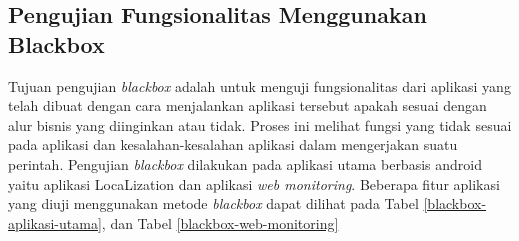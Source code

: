 \subsection{Pengujian Fungsionalitas Menggunakan Blackbox}
\par Tujuan pengujian \textit{blackbox} adalah untuk menguji fungsionalitas dari aplikasi yang telah dibuat dengan cara menjalankan aplikasi tersebut apakah sesuai dengan alur bisnis yang diinginkan atau tidak. Proses ini melihat fungsi yang tidak sesuai pada aplikasi dan kesalahan-kesalahan aplikasi dalam mengerjakan suatu perintah. Pengujian \textit{blackbox} dilakukan pada aplikasi utama berbasis android yaitu aplikasi LocaLization dan aplikasi \textit{web monitoring}. Beberapa fitur aplikasi yang diuji menggunakan metode \textit{blackbox} dapat dilihat pada Tabel \ref{blackbox-aplikasi-utama}, dan Tabel \ref{blackbox-web-monitoring}


